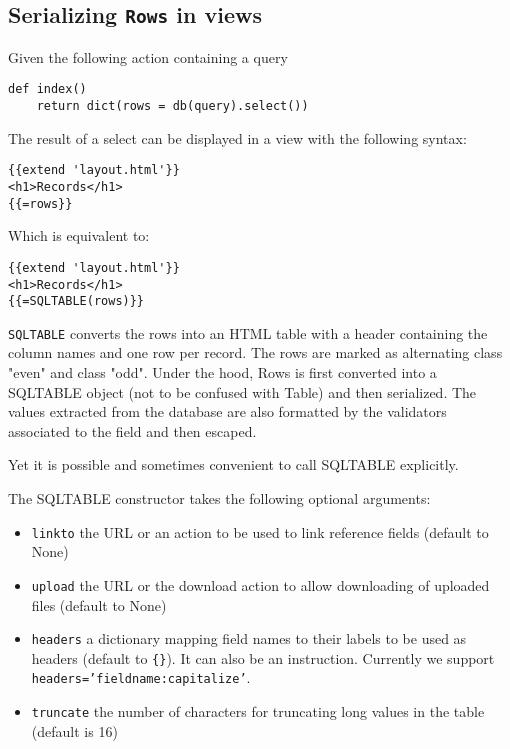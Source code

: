 \documentclass[justified,sixbynine,notoc]{tufte-book}
\def\ft{\small\tt}
\def\inxx#1{\index{#1}}
\begin{document}
\begin{fullwidth}
\goodbreak\subsection{Serializing {\ft Rows} in views}

Given the following action containing a query
\inxx{SQLTABLE}

\begin{lstlisting}
def index()
    return dict(rows = db(query).select())
\end{lstlisting}

The result of a select can be displayed in a view with the following syntax:
\begin{lstlisting}[keywords={}]
{{extend 'layout.html'}}
<h1>Records</h1>
{{=rows}}
\end{lstlisting}

Which is equivalent to:
\begin{lstlisting}[keywords={}]
{{extend 'layout.html'}}
<h1>Records</h1>
{{=SQLTABLE(rows)}}
\end{lstlisting}

{\ft SQLTABLE} converts the rows into an HTML table with a header containing the column names and one row per record. The rows are marked as alternating class "even" and class "odd". Under the hood, Rows is first converted into a SQLTABLE object (not to be confused with Table) and then serialized. The values extracted from the database are also formatted by the validators associated to the field and then escaped.

Yet it is possible and sometimes convenient to call SQLTABLE explicitly.

The SQLTABLE constructor takes the following optional arguments:

\begin{itemize}
\item {\ft linkto} the URL or an action to be used to link reference fields (default to None)

\item {\ft upload} the URL or the download action to allow downloading of uploaded files (default to None)

\item {\ft headers} a dictionary mapping field names to their labels to be used as headers (default to {\ft \{\}}). It can also be an instruction. Currently we support {\ft headers='fieldname:capitalize'}.

\item {\ft truncate} the number of characters for truncating long values in the table (default is 16)


\end{itemize}
\end{fullwidth}
\end{document}
